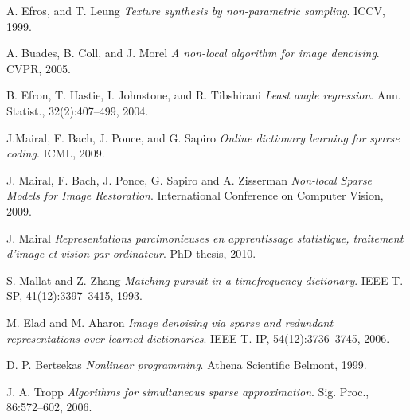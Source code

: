 \documentclass{ipol}
\begin{document}
\begin{thebibliography}{9}

	A. Efros, and T. Leung
	\emph{Texture synthesis by non-parametric sampling}.
	ICCV,
	1999.

	A. Buades, B. Coll, and J. Morel
	\emph{A non-local algorithm for image denoising}.
	CVPR,
	2005.

	B. Efron, T. Hastie, I. Johnstone, and R. Tibshirani
	\emph{Least angle regression}. 
	Ann. Statist.,
	32(2):407–499,
	2004.

	J.Mairal, F. Bach, J. Ponce, and G. Sapiro
	\emph{Online dictionary learning for sparse coding}.
	ICML,
	2009.

	J. Mairal, F. Bach, J. Ponce, G. Sapiro and A. Zisserman
	\emph{ Non-local Sparse Models for Image Restoration}.
	International Conference on Computer Vision,
	2009.

	J. Mairal
	\emph{ Representations parcimonieuses en apprentissage statistique, traitement d’image et
vision par ordinateur}.
	PhD thesis,
	2010.

	S. Mallat and Z. Zhang
 	\emph{Matching pursuit in a timefrequency dictionary}.
	IEEE T. SP,
	41(12):3397–3415,
	1993.

	M. Elad and M. Aharon
	\emph{Image denoising via sparse and redundant representations over learned dictionaries}.
	IEEE T.
	IP, 54(12):3736–3745,
	2006.
	
	D. P. Bertsekas
	\emph{Nonlinear programming}.
	Athena Scientific Belmont,
	1999.
	
	J. A. Tropp
	\emph{Algorithms for simultaneous sparse approximation}.
	Sig. Proc.,
	86:572–602,
	2006.	

\end{thebibliography}
\end{document}
